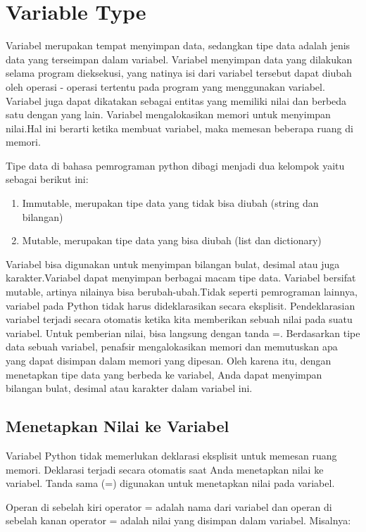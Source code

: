 \section{Variable Type}
Variabel merupakan tempat menyimpan data, sedangkan tipe data adalah jenis data yang terseimpan dalam variabel. Variabel menyimpan data yang dilakukan selama program dieksekusi, yang natinya isi dari variabel tersebut dapat diubah oleh operasi - operasi tertentu pada program yang menggunakan variabel. Variabel juga dapat dikatakan sebagai entitas yang memiliki nilai dan berbeda satu dengan yang lain. Variabel mengalokasikan memori untuk menyimpan nilai.Hal ini berarti ketika membuat variabel, maka  memesan beberapa ruang di memori. 

Tipe data di bahasa pemrograman python dibagi menjadi dua kelompok yaitu sebagai berikut ini:
\begin{enumerate}
	\item Immutable, merupakan tipe data yang tidak bisa diubah (string dan bilangan)
	\item Mutable, merupakan tipe data yang bisa diubah (list dan dictionary)
\end{enumerate}  

Variabel bisa digunakan untuk menyimpan bilangan bulat, desimal atau juga karakter.Variabel dapat menyimpan berbagai macam tipe data. Variabel bersifat mutable, artinya nilainya bisa berubah-ubah.Tidak seperti pemrograman lainnya, variabel pada Python tidak harus dideklarasikan secara eksplisit. Pendeklarasian variabel terjadi secara otomatis ketika kita memberikan sebuah nilai pada suatu variabel. Untuk pemberian nilai, bisa langsung dengan tanda =. Berdasarkan tipe data sebuah variabel, penafsir mengalokasikan memori dan memutuskan apa yang dapat disimpan dalam memori yang dipesan. Oleh karena itu, dengan menetapkan tipe data yang berbeda ke variabel, Anda dapat menyimpan bilangan bulat, desimal atau karakter dalam variabel ini.

\subsection{Menetapkan Nilai ke Variabel}
Variabel Python tidak memerlukan deklarasi eksplisit untuk memesan ruang memori. Deklarasi terjadi secara otomatis saat Anda menetapkan nilai ke variabel. Tanda sama (=) digunakan untuk menetapkan nilai pada variabel.

Operan di sebelah kiri operator = adalah nama dari variabel dan operan di sebelah kanan operator = adalah nilai yang disimpan dalam variabel. Misalnya:

